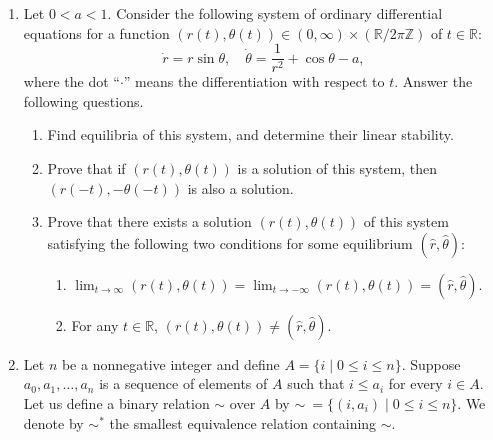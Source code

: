 \documentclass[10pt,a4paper]{article}
\begin{document}
\begin{enumerate}[label=\fbox{\arabic*}]
  \item %
        Let $0 < a < 1$. Consider the following system of ordinary differential equations for a function $(r(t), \theta(t)) \in (0, \infty) \times (\mathbb{R}/2\pi\mathbb{Z})$ of $t \in \mathbb{R}$:
        \[
          \dot{r} = r \sin \theta, \quad \dot{\theta} = \frac{1}{r^2} + \cos \theta - a,
        \]
        where the dot ``$\cdot$'' means the differentiation with respect to $t$. Answer the following questions.
        \begin{enumerate}[label=(\arabic*)]
          \item Find equilibria of this system, and determine their linear stability.
          \item Prove that if $(r(t), \theta(t))$ is a solution of this system, then $(r(-t), -\theta(-t))$ is also a solution.
          \item Prove that there exists a solution $(r(t), \theta(t))$ of this system satisfying the following two conditions for some equilibrium $(\hat{r}, \hat{\theta})$:
          \begin{enumerate}
            \item[(a)] $\lim_{t \to \infty} (r(t), \theta(t)) = \lim_{t \to -\infty} (r(t), \theta(t)) = (\hat{r}, \hat{\theta})$.
            \item[(b)] For any $t \in \mathbb{R}$, $(r(t), \theta(t)) \neq (\hat{r}, \hat{\theta})$.
          \end{enumerate}
        \end{enumerate}

  \item %
        Let $n$ be a nonnegative integer and define $A = \{i \mid 0 \le i \le n\}$. Suppose $a_0, a_1, \dots, a_n$ is a sequence of elements of $A$ such that $i \le a_i$ for every $i \in A$. Let us define a binary relation $\sim$ over $A$ by $\sim\ = \{(i, a_i) \mid 0 \le i \le n\}$. We denote by $\sim^*$ the smallest equivalence relation containing $\sim$.
        

\end{enumerate}
\end{document}
